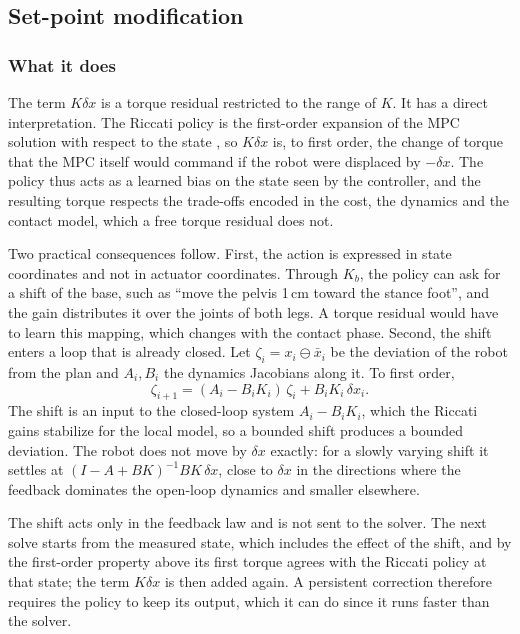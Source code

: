 \documentclass[conference]{IEEEtran}
\newcommand{\xb}{\bar{x}}
\begin{document}
\subsection{Set-point modification}
\subsubsection{What it does}
The term $K\delta x$ is a torque residual restricted to the range of $K$.
It has a direct interpretation.
The Riccati policy is the first-order expansion of the MPC solution with respect to the state \cite{dantec2022firstorder}, so $K\delta x$ is, to first order, the change of torque that the MPC itself would command if the robot were displaced by $-\delta x$.
The policy thus acts as a learned bias on the state seen by the controller, and the resulting torque respects the trade-offs encoded in the cost, the dynamics and the contact model, which a free torque residual does not.

Two practical consequences follow.
First, the action is expressed in state coordinates and not in actuator coordinates.
Through $K_b$, the policy can ask for a shift of the base, such as ``move the pelvis 1\,cm toward the stance foot'', and the gain distributes it over the joints of both legs.
A torque residual would have to learn this mapping, which changes with the contact phase.
Second, the shift enters a loop that is already closed.
Let $\zeta_i=x_i\ominus\xb_i$ be the deviation of the robot from the plan and $A_i,B_i$ the dynamics Jacobians along it.
To first order,
\begin{equation}
\zeta_{i+1}=(A_i-B_iK_i)\,\zeta_i+B_iK_i\,\delta x_i .
\label{eq:cl}
\end{equation}
The shift is an input to the closed-loop system $A_i-B_iK_i$, which the Riccati gains stabilize for the local model, so a bounded shift produces a bounded deviation.
The robot does not move by $\delta x$ exactly: for a slowly varying shift it settles at $(I-A+BK)^{-1}BK\,\delta x$, close to $\delta x$ in the directions where the feedback dominates the open-loop dynamics and smaller elsewhere.

The shift acts only in the feedback law and is not sent to the solver.
The next solve starts from the measured state, which includes the effect of the shift, and by the first-order property above its first torque agrees with the Riccati policy at that state; the term $K\delta x$ is then added again.
A persistent correction therefore requires the policy to keep its output, which it can do since it runs faster than the solver.
\end{document}
